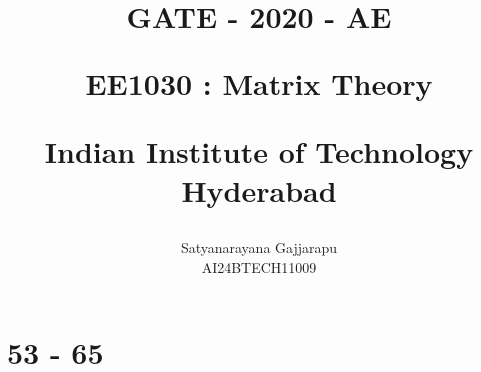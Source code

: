 \documentclass[journal]{IEEEtran}
\begin{document}

\vspace{3cm}




\title{
GATE - 2020 - AE

\large{EE1030 : Matrix Theory}

Indian Institute of Technology Hyderabad
}
\author{Satyanarayana Gajjarapu

AI24BTECH11009
}	





\maketitle




\bigskip

\renewcommand{\thefigure}{\theenumi}
\renewcommand{\thetable}{\theenumi}


\section{53 - 65}
\end{document}
